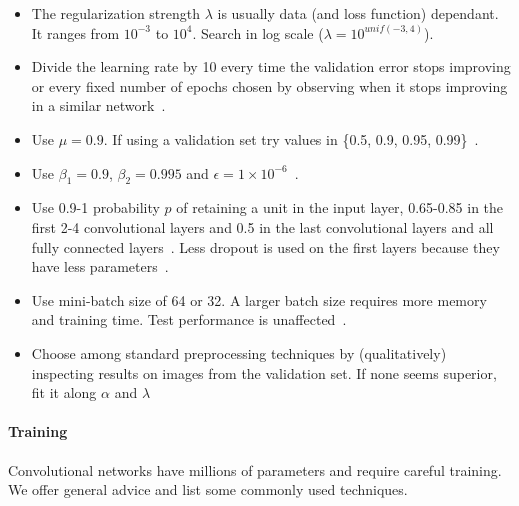 \begin{itemize}
	\item The regularization strength $\lambda$ is usually data (and loss function) dependant. It ranges from $10^{-3}$ to $10^4$. Search in log scale ($\lambda = 10^{unif(-3, 4)}$).
	\item Divide the learning rate by 10 every time the validation error stops improving or every fixed number of epochs chosen by observing when it stops improving in a similar network~\cite{Krizhevsky2012, He2015b}.

	\item Use $\mu=0.9$. If using a validation set try values in \{0.5, 0.9, 0.95, 0.99\}~\cite{Karpathy2016}.

	\item Use $\beta_1 = 0.9$, $\beta_2 = 0.995$ and $\epsilon = 1 {\times} 10^{-6}$~\cite{Karpathy2016}.

	\item Use 0.9-1 probability $p$ of retaining a unit in the input layer, 0.65-0.85 in the first 2-4 convolutional layers and 0.5 in the last convolutional layers and all fully connected layers~\cite{Srivastava2014}. Less dropout is used on the first layers because they have less parameters~\cite{Karpathy2016}.

	\item Use mini-batch size of 64 or 32. A larger batch size requires more memory and training time. Test performance is unaffected~\cite{Bengio2012}.

	\item Choose among standard preprocessing techniques by (qualitatively) inspecting results on images from the validation set. If none seems superior, fit it along $\alpha$ and $\lambda$%
\end{itemize}



\paragraph{Training} Convolutional networks have millions of parameters and require careful training. We offer general advice and list some commonly used techniques.

